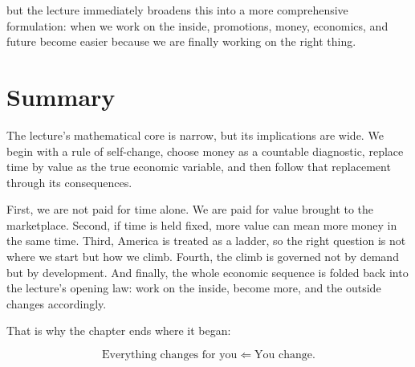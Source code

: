 but the lecture immediately broadens this into a more comprehensive formulation: when we work on the inside, promotions, money, economics, and future become easier because we are finally working on the right thing.

\section{Summary}

The lecture's mathematical core is narrow, but its implications are wide. We begin with a rule of self-change, choose money as a countable diagnostic, replace time by value as the true economic variable, and then follow that replacement through its consequences.

First, we are not paid for time alone. We are paid for value brought to the marketplace. Second, if time is held fixed, more value can mean more money in the same time. Third, America is treated as a ladder, so the right question is not where we start but how we climb. Fourth, the climb is governed not by demand but by development. And finally, the whole economic sequence is folded back into the lecture's opening law: work on the inside, become more, and the outside changes accordingly.

That is why the chapter ends where it began:

\begin{equation}
\text{Everything changes for you} \Longleftarrow \text{You change}.
\end{equation}